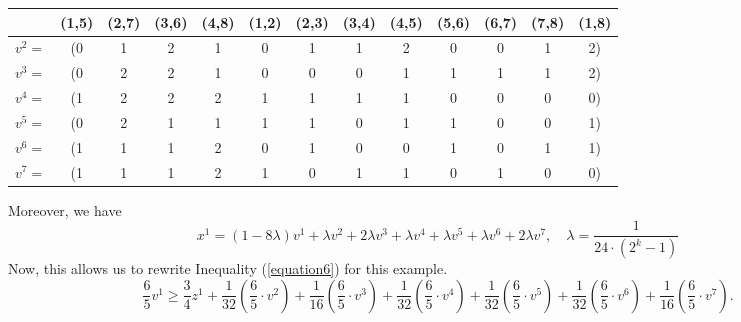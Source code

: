 \begin{example}
\begin{table}[h]
	\centering
	\begin{tabular}{ccccccccccccc}
		\toprule
		& (1,5) & (2,7)& (3,6)&(4,8)&(1,2)&(2,3)&(3,4)&(4,5)&(5,6)&(6,7)&(7,8)&(1,8)      \\ \midrule
			$v^2=$ & (0&1&2&1&0&1&1&2&0&0&1&2)  \\
			$v^3=$ & (0&2&2&1&0&0&0&1&1&1&1&2)\\
			$v^4=$ & (1&2&2&2&1&1&1&1&0&0&0&0)\\
			$v^5=$ & (0&2&1&1&1&1&0&1&1&0&0&1)\\
			$v^6=$ & (1&1&1&2&0&1&0&0&1&0&1&1)\\
			$v^7=$ & (1&1&1&2&1&0&1&1&0&1&0&0)\\
				 \bottomrule
	\end{tabular}
\end{table}
Moreover, we have 
\begin{equation*}
x^1 = (1-8\lambda)v^1+ \lambda v^2 + 2\lambda v^3+\lambda v^4+ \lambda v^5+ \lambda v^6 + 2\lambda v^7, \quad \lambda = \frac{1}{24\cdot (2^k-1)}
\end{equation*}
Now, this allows us to rewrite Inequality (\ref{equation6}) for this example.
\begin{equation*} 
\frac{6}{5}v^1 \geq \frac{3}{4} z^1 +\frac{1}{32}(\frac{6}{5}\cdot v^2) +\frac{1}{16}(\frac{6}{5}\cdot v^3) + \frac{1}{32}(\frac{6}{5}\cdot v^4)+\frac{1}{32}(\frac{6}{5}\cdot v^5) + \frac{1}{32}(\frac{6}{5}\cdot v^6)+ \frac{1}{16}(\frac{6}{5}\cdot v^7).  
\end{equation*}
\end{example}

